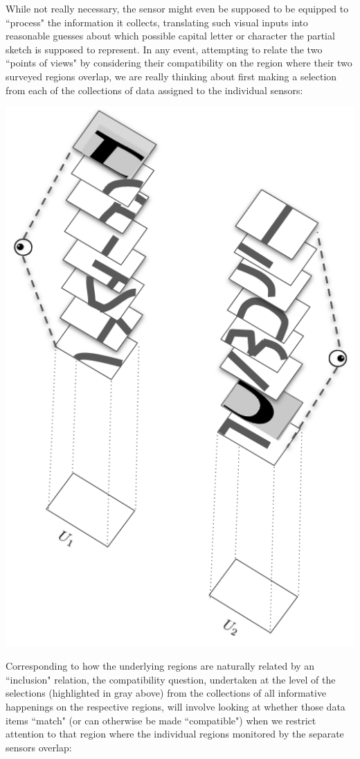 \documentclass[11pt]{book}
\theoremstyle{definition}
\theoremstyle{definition}
\theoremstyle{definition}
\theoremstyle{theorem}
\theoremstyle{definition}
\begin{document}
	While not really necessary, the sensor might even be supposed to be equipped to ``process" the information it collects, translating such visual inputs into reasonable guesses about which possible capital letter or character the partial sketch is supposed to represent. In any event, attempting to relate the two ``points of views" by considering their compatibility on the region where their two surveyed regions overlap, we are really thinking about first making a selection from each of the collections of data assigned to the individual sensors:   
	\begin{center}
		\includegraphics[scale=0.25]{EyeballBest2.png}
	\end{center}
Corresponding to how the underlying regions are naturally related by an ``inclusion" relation, the compatibility question, undertaken at the level of the selections (highlighted in gray above) from the collections of all informative happenings on the respective regions, will involve looking at whether those data items ``match" (or can otherwise be made ``compatible") when we restrict attention to that region where the individual regions monitored by the separate sensors overlap:  
\end{document}
